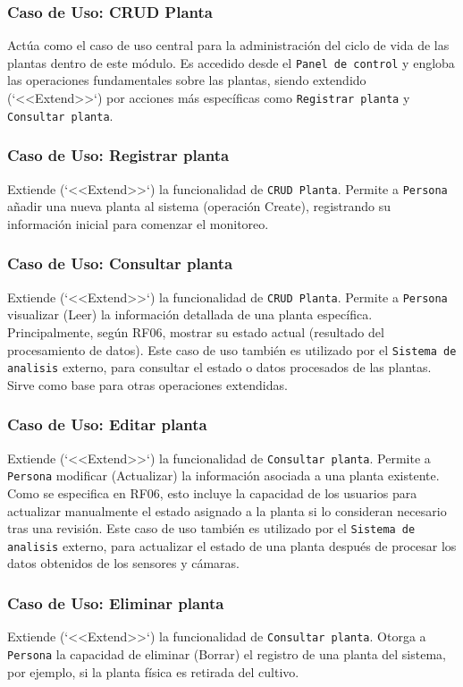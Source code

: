 \subsubsection*{Caso de Uso: CRUD Planta}
Actúa como el caso de uso central para la administración del ciclo de vida de las plantas dentro de este módulo. Es accedido desde el \texttt{Panel de control} y engloba las operaciones fundamentales sobre las plantas, siendo extendido (`<<Extend>>`) por acciones más específicas como \texttt{Registrar planta} y \texttt{Consultar planta}.

\subsubsection*{Caso de Uso: Registrar planta}
Extiende (`<<Extend>>`) la funcionalidad de \texttt{CRUD Planta}. Permite a \texttt{Persona} añadir una nueva planta al sistema (operación Create), registrando su información inicial para comenzar el monitoreo.

\subsubsection*{Caso de Uso: Consultar planta}
Extiende (`<<Extend>>`) la funcionalidad de \texttt{CRUD Planta}. Permite a \texttt{Persona} visualizar (Leer) la información detallada de una planta específica. Principalmente, según RF06, mostrar su estado actual (resultado del procesamiento de datos). Este caso de uso también es utilizado por el \texttt{Sistema de analisis} externo, para consultar el estado o datos procesados de las plantas. Sirve como base para otras operaciones extendidas.

\subsubsection*{Caso de Uso: Editar planta}
Extiende (`<<Extend>>`) la funcionalidad de \texttt{Consultar planta}. Permite a \texttt{Persona} modificar (Actualizar) la información asociada a una planta existente. Como se especifica en RF06, esto incluye la capacidad de los usuarios para actualizar manualmente el estado asignado a la planta si lo consideran necesario tras una revisión. Este caso de uso también es utilizado por el \texttt{Sistema de analisis} externo, para actualizar el estado de una planta después de procesar los datos obtenidos de los sensores y cámaras.

\subsubsection*{Caso de Uso: Eliminar planta}
Extiende (`<<Extend>>`) la funcionalidad de \texttt{Consultar planta}. Otorga a \texttt{Persona} la capacidad de eliminar (Borrar) el registro de una planta del sistema, por ejemplo, si la planta física es retirada del cultivo.

